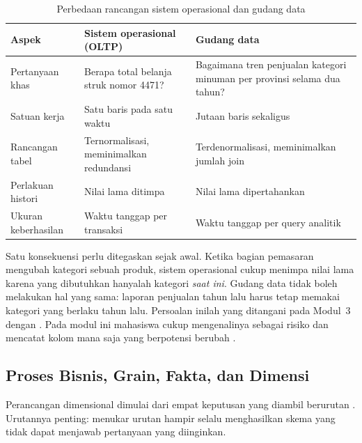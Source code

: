 \begin{table}[htbp]
\centering
\small
\caption{Perbedaan rancangan sistem operasional dan gudang data}
\label{tab:m1-oltp-dw}
\begin{tabular}{@{}p{}p{}p{}@{}}
\toprule
\textbf{Aspek} & \textbf{Sistem operasional (OLTP)} & \textbf{Gudang data} \\
\midrule
Pertanyaan khas & Berapa total belanja struk nomor 4471? &
  Bagaimana tren penjualan kategori minuman per provinsi selama dua tahun? \\
Satuan kerja & Satu baris pada satu waktu & Jutaan baris sekaligus \\
Rancangan tabel & Ternormalisasi, meminimalkan redundansi &
  Terdenormalisasi, meminimalkan jumlah join \\
Perlakuan histori & Nilai lama ditimpa & Nilai lama dipertahankan \\
Ukuran keberhasilan & Waktu tanggap per transaksi & Waktu tanggap per query
  analitik \\
\bottomrule
\end{tabular}
\end{table}

Satu konsekuensi perlu ditegaskan sejak awal. Ketika bagian pemasaran mengubah
kategori sebuah produk, sistem operasional cukup menimpa nilai lama karena yang
dibutuhkan hanyalah kategori \emph{saat ini}. Gudang data tidak boleh melakukan
hal yang sama: laporan penjualan tahun lalu harus tetap memakai kategori yang
berlaku tahun lalu. Persoalan inilah yang ditangani pada Modul~3 dengan
. Pada modul ini mahasiswa cukup
mengenalinya sebagai risiko dan mencatat kolom mana saja yang berpotensi
berubah \citep{kimball2013}.

\subsection{Proses Bisnis, Grain, Fakta, dan Dimensi}

Perancangan dimensional dimulai dari empat keputusan yang diambil berurutan
\citep{kimball2013}. Urutannya penting: menukar urutan hampir selalu
menghasilkan skema yang tidak dapat menjawab pertanyaan yang diinginkan.

